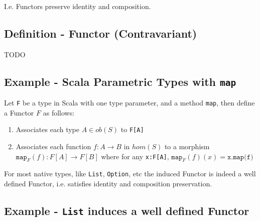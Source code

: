 \documentclass[9pt]{article} %
\begin{document}
I.e. Functors preserve identity and composition.

\subsection{Definition - Functor (Contravariant)}

TODO

\subsection{Example - Scala Parametric Types with \texttt{map}}
\label{Functor Example}

Let \texttt{F} be a type in Scala with one type parameter, and a method \texttt{map}, then define a Functor $F$ as follows:

\begin{enumerate}
    \item Associates each type $A \in ob(S)$ to \texttt{F[A]}
    \item Associates each function $f: A \rightarrow B$ in $hom(S)$ to a morphism $\texttt{map}_F(f): F[A] \rightarrow F[B]$ where for any \texttt{x:F[A]}, $\texttt{map}_F(f)(x) = \texttt{x.map(f)}$
\end{enumerate}

For most native types, like \texttt{List}, \texttt{Option}, etc the induced Functor is indeed a well defined Functor, i.e. satisfies identity and composition preservation.

\subsection{Example - \texttt{List} induces a well defined Functor}
\end{document}
